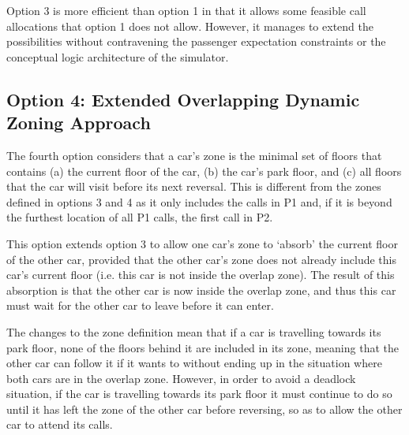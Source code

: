 \documentclass{UoYCSproject}
\begin{document}
Option 3 is more efficient than option 1 in that it allows some feasible call allocations that option 1 does not allow.  However, it manages to extend the possibilities without contravening the passenger expectation constraints or the conceptual logic architecture of the simulator.

\subsection{Option 4: Extended Overlapping Dynamic Zoning Approach}
\label{tesoption4}

The fourth option considers that a car's zone is the minimal set of floors that contains (a) the current floor of the car, (b) the car's park floor, and (c) all floors that the car will visit before its next reversal.  This is different from the zones defined in options 3 and 4 as it only includes the calls in P1 and, if it is beyond the furthest location of all P1 calls, the first call in P2.

This option extends option 3 to allow one car's zone to `absorb' the current floor of the other car, provided that the other car's zone does not already include this car's current floor (i.e. this car is not inside the overlap zone).  The result of this absorption is that the other car is now inside the overlap zone, and thus this car must wait for the other car to leave before it can enter.

The changes to the zone definition mean that if a car is travelling towards its park floor, none of the floors behind it are included in its zone, meaning that the other car can follow it if it wants to without ending up in the situation where both cars are in the overlap zone.  However, in order to avoid a deadlock situation, if the car is travelling towards its park floor it must continue to do so until it has left the zone of the other car before reversing, so as to allow the other car to attend its calls.
\end{document}
